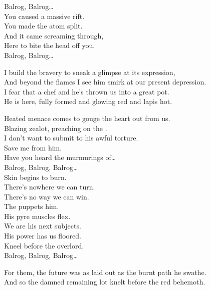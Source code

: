 Balrog, Balrog… \\

You caused a massive rift. \\
You made the atom split. \\
And it came screaming through, \\
Here to bite the head off you. \\

Balrog, Balrog… \\


I build the bravery to sneak a glimpse at its expression, \\
And beyond the flames I see him smirk at our present depression. \\

I fear that  a chef and he's thrown us into a great pot. \\
He is here, fully formed and glowing red and lapis hot. \\


Heated menace comes to gouge the heart out from us. \\
Blazing zealot, preaching on the . \\
I don't want to submit to his awful torture. \\
Save me from him. \\
Have you heard the murmurings of… \\

Balrog, Balrog, Balrog… \\

Skin begins to burn. \\
There's nowhere we can turn. \\
There's no way we can win. \\
The  puppets him. \\

His pyre muscles flex. \\
We are his next subjects. \\
His power has us floored. \\
Kneel before the overlord. \\

Balrog, Balrog, Balrog… \\


For them, the future was as laid out as the burnt path he swathe. \\
And so the damned remaining lot knelt before the red behemoth. \\

